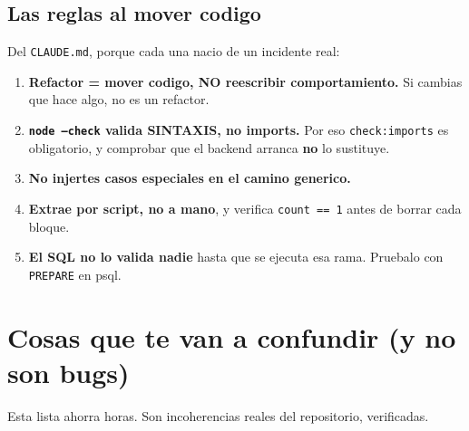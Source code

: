 \documentclass[11pt,a4paper,oneside]{report}
\newcommand{\rt}[1]{\texttt{#1}}
\begin{document}
\section{Las reglas al mover codigo}

Del \rt{CLAUDE.md}, porque cada una nacio de un incidente real:

\begin{enumerate}[leftmargin=1.6em]
  \item \textbf{Refactor = mover codigo, NO reescribir comportamiento.} Si cambias que hace algo,
        no es un refactor.
  \item \textbf{\rt{node --check} valida SINTAXIS, no imports.} Por eso \rt{check:imports} es
        obligatorio, y comprobar que el backend arranca \textbf{no} lo sustituye.
  \item \textbf{No injertes casos especiales en el camino generico.}
  \item \textbf{Extrae por script, no a mano}, y verifica \rt{count == 1} antes de borrar cada
        bloque.
  \item \textbf{El SQL no lo valida nadie} hasta que se ejecuta esa rama. Pruebalo con
        \rt{PREPARE} en psql.
\end{enumerate}

\chapter{Cosas que te van a confundir (y no son bugs)}

Esta lista ahorra horas. Son incoherencias reales del repositorio, verificadas.
\end{document}
